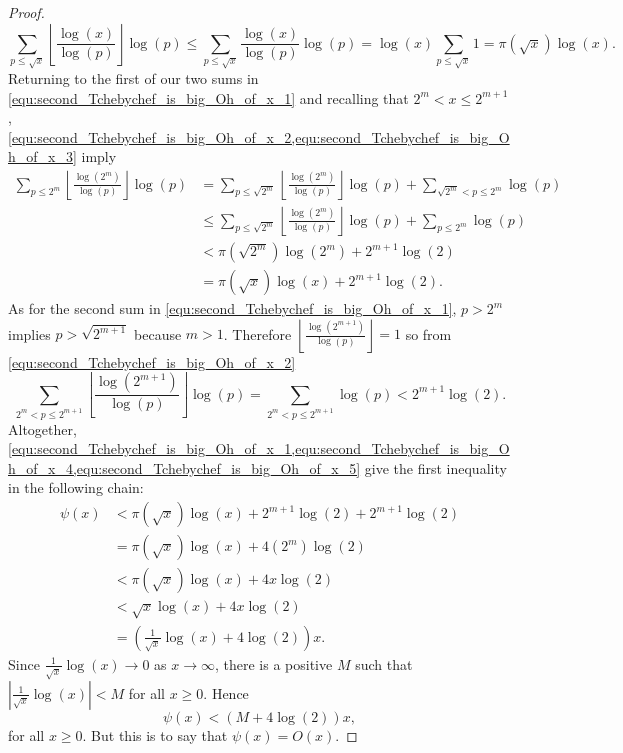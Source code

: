 \begin{proof}
\begin{equation}
          \sum_{p \le \sqrt{x}}\left\lfloor\frac{\log(x)}{\log(p)}\right\rfloor\log(p) \le \sum_{p \le \sqrt{x}}\frac{\log(x)}{\log(p)}\log(p) = \log(x)\sum_{p \le \sqrt{x}}1 = \pi(\sqrt{x})\log(x).
        \end{equation}
        Returning to the first of our two sums in \cref{equ:second_Tchebychef_is_big_Oh_of_x_1} and recalling that $2^{m} < x \le 2^{m+1}$, \cref{equ:second_Tchebychef_is_big_Oh_of_x_2,equ:second_Tchebychef_is_big_Oh_of_x_3} imply
        \begin{equation}\label{equ:second_Tchebychef_is_big_Oh_of_x_4}
          \begin{aligned}
            \sum_{p \le 2^{m}}\left\lfloor\frac{\log(2^{m})}{\log(p)}\right\rfloor\log(p) &= \sum_{p \le \sqrt{2^{m}}}\left\lfloor\frac{\log(2^{m})}{\log(p)}\right\rfloor\log(p)+\sum_{\sqrt{2^{m}} < p \le 2^{m}}\log(p) \\
            &\le \sum_{p \le \sqrt{2^{m}}}\left\lfloor\frac{\log(2^{m})}{\log(p)}\right\rfloor\log(p)+\sum_{p \le 2^{m}}\log(p) \\
            &< \pi(\sqrt{2^{m}})\log(2^{m})+2^{m+1}\log(2) \\
            &= \pi(\sqrt{x})\log(x)+2^{m+1}\log(2).
          \end{aligned}
        \end{equation}
        As for the second sum in \cref{equ:second_Tchebychef_is_big_Oh_of_x_1}, $p > 2^{m}$ implies $p > \sqrt{2^{m+1}}$ because $m > 1$. Therefore $\left\lfloor\frac{\log(2^{m+1})}{\log(p)}\right\rfloor = 1$ so from \cref{equ:second_Tchebychef_is_big_Oh_of_x_2}
        \begin{equation}\label{equ:second_Tchebychef_is_big_Oh_of_x_5}
          \sum_{2^{m} < p \le 2^{m+1}}\left\lfloor\frac{\log(2^{m+1})}{\log(p)}\right\rfloor\log(p) = \sum_{2^{m} < p \le 2^{m+1}}\log(p) < 2^{m+1}\log(2).
        \end{equation}
        Altogether, \cref{equ:second_Tchebychef_is_big_Oh_of_x_1,equ:second_Tchebychef_is_big_Oh_of_x_4,equ:second_Tchebychef_is_big_Oh_of_x_5} give the first inequality in the following chain:
        \begin{align*}
          \psi(x) &< \pi(\sqrt{x})\log(x)+2^{m+1}\log(2)+2^{m+1}\log(2) \\
          &= \pi(\sqrt{x})\log(x)+4(2^{m})\log(2) \\
          &< \pi(\sqrt{x})\log(x)+4x\log(2) \\
          &< \sqrt{x}\log(x)+4x\log(2) \\
          &= \left(\frac{1}{\sqrt{x}}\log(x)+4\log(2)\right)x.
        \end{align*}
        Since $\frac{1}{\sqrt{x}}\log(x) \to 0$ as $x \to \infty$, there is a positive $M$ such that $\left|\frac{1}{\sqrt{x}}\log(x)\right| < M$ for all $x \ge 0$. Hence
        \[
          \psi(x) < (M+4\log(2))x,
        \]
        for all $x \ge 0$. But this is to say that $\psi(x) = O(x)$.
      \end{proof}

